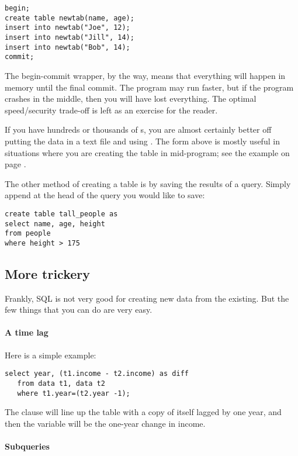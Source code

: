 \begin{lstlisting}
begin;
create table newtab(name, age);
insert into newtab("Joe", 12);
insert into newtab("Jill", 14);
insert into newtab("Bob", 14);
commit;
\end{lstlisting}

The begin-commit wrapper, by the way, means that everything will happen
in memory until the final commit. The program may run faster, but if
the program crashes in the middle, then you will have lost everything.
The optimal speed/security trade-off is left as an exercise for the
reader.

If you have hundreds or thousands of s, you are almost certainly better off putting the data
in a text file and using . The form
above is mostly useful in situations where you are creating the table in mid-program; see the example on page \pageref{createeg}.


The other method of creating a table is by saving the results of a
query. Simply append  at the head of the
query you would like to save: 
\begin{lstlisting}
create table tall_people as
select name, age, height 
from people
where height > 175
\end{lstlisting}



\subsection{More trickery} Frankly, SQL is not very good for
creating new data from the existing. But the few things that you can do
are very easy.

\paragraph{A time lag} Here is a simple example:
\begin{lstlisting}
select year, (t1.income - t2.income) as diff
   from data t1, data t2
   where t1.year=(t2.year -1);
\end{lstlisting}


The  clause will line up the table with a copy of itself
lagged by one year, and then the  variable will be the
one-year change in income.


\paragraph{Subqueries}

